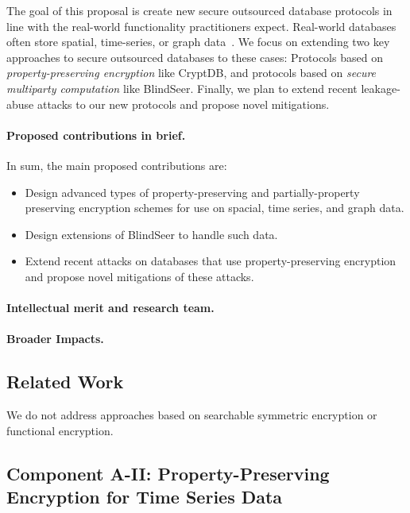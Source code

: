 \documentclass[11pt]{article}
\theoremstyle{remark}
\begin{document}
The goal of this proposal is create new secure outsourced database protocols in line with the real-world functionality practitioners expect.  Real-world databases often store spatial, time-series, or graph data~\cite{SP:FVYSHG17}.  We focus on extending two key approaches to secure outsourced databases to these cases: Protocols based on \emph{property-preserving encryption} like CryptDB, and protocols based on \emph{secure multiparty computation} like BlindSeer.  Finally, we plan to extend recent leakage-abuse attacks to our new protocols and propose novel mitigations.

\paragraph*{Proposed contributions in brief.}
In sum, the main proposed contributions are:
\begin{itemize}
\item Design advanced types of property-preserving and partially-property preserving encryption schemes for use on spacial, time series, and graph data.
\item Design extensions of BlindSeer to handle such data.
\item Extend recent attacks on databases that use property-preserving encryption and propose novel mitigations of these attacks. 
\end{itemize}

\paragraph*{Intellectual merit and research team.}  

 \paragraph*{Broader Impacts.}

\subsection{Related Work}

We do not address approaches based on searchable symmetric encryption or functional encryption.  




\subsection{Component A-II:  Property-Preserving Encryption for Time Series Data} 
\end{document}

